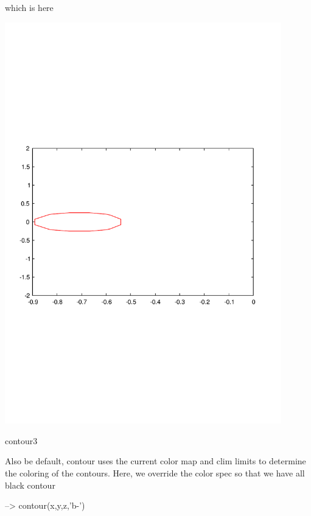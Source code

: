 which is here  
\begin{DoxyImage}
\includegraphics[width=12cm]{contour3}
\caption{contour3}
\end{DoxyImage}
 Also be default, {\ttfamily contour} uses the current color map and {\ttfamily clim} limits to determine the coloring of the contours. Here, we override the color spec so that we have all black contour


\begin{DoxyVerbInclude}
--> contour(x,y,z,'b-')
\end{DoxyVerbInclude}


